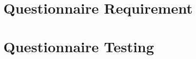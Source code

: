 \documentclass[
    oneside,
    11pt,
    a4paper
]{utad_msc}
\makeatletter
\renewcommand{\frontmatter}{\cleardoublepage\@mainmatterfalse}
\renewcommand{\mainmatter}{\cleardoublepage\@mainmattertrue}
\makeatother
\begin{document}
    
    \pagestyle{empty}
    
    \tableofcontents
    \clearpage
    \pagestyle{fancy}

    \frontmatter
      

    \mainmatter %
      
      
      
      
      
      
      \appendix
      \chapter{Questionnaire Requirement}
      \chapter{Questionnaire Testing}
      \printbibliography
\end{document}
